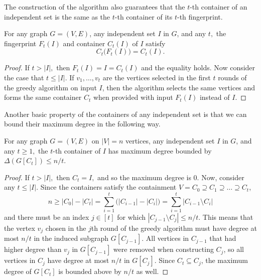\documentclass[11pt]{article}
\begin{document}
The construction of the algorithm also guarantees that the $t$-th container of an independent set is the same as the $t$-th container of its $t$-th fingerprint.

\begin{proposition}
\label{prop:container-closure}
For any graph $G = (V,E)$, any independent set $I$ in $G$, and any $t,$ the fingerprint $F_t(I)$ and container $C_t(I)$ of $I$ satisfy 
\[
C_t\big( F_t(I) \big) = C_t(I).
\]
\end{proposition}

\begin{proof}
If $t> |I|,$ then $F_t(I)=I=C_t(I)$ and the equality holds.
Now consider the case that $t \leq |I|.$ 
If $v_1,\ldots,v_t$ are the vertices selected in the first $t$ rounds of the greedy algorithm on input $I$, then the algorithm selects the same vertices and forms the same container $C_t$ when provided with input $F_t(I)$ instead of $I$.
\end{proof}

Another basic property of the containers of any independent set is that we can bound their maximum degree in the following way.

\begin{proposition}
\label{prop:container-degree}
For any graph $G = (V,E)$ on $|V| = n$ vertices, any independent set $I$ in $G$, and any $t \ge 1,$ the $t$-th container of $I$ has maximum degree bounded by $\Delta(G[C_t]) \le n/t$.
\end{proposition}

\begin{proof}
If $t > |I|,$ then $C_t=I,$ and so the maximum degree is $0.$
Now, consider any $t \le |I|$.
Since the containers satisfy the containment $V = C_0 \supseteq C_1 \supseteq \dots \supseteq C_t$, 
\[
n \ge |C_0| - |C_t| = \sum_{i=1}^t \big(|C_{i-1}| - |C_i| \big) = 
\sum_{i=1}^t |C_{i-1} \setminus C_i|
\]
and there must be an index $j \in [t]$ for which $|C_{j-1} \setminus C_j| \leq n/t$. This means that the vertex $v_j$ chosen in the $j$th round of the greedy algorithm must have degree at most $n/t$ in the induced subgraph $G[C_{j-1}]$. All vertices in $C_{j-1}$ that had higher degree than $v_j$ in $G[C_{j-1}]$ were removed when constructing $C_j$, so all vertices in $C_j$ have degree at most $n/t$ in $G[C_j]$. Since $C_t \subseteq C_j$, the maximum degree of $G[C_t]$ is bounded above by $n/t$ as well.
\end{proof}
\end{document}
